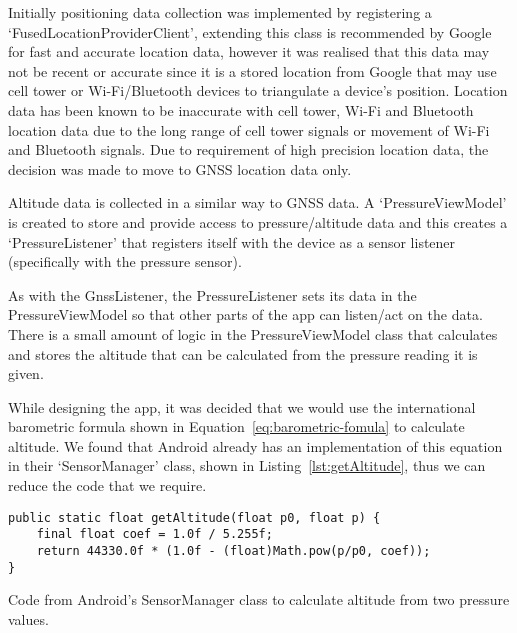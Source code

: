 Initially positioning data collection was implemented by registering a `FusedLocationProviderClient', extending this class is recommended by Google for fast and accurate location data, however it was realised that this data may not be recent or accurate since it is a stored location from Google that may use cell tower or Wi-Fi/Bluetooth devices to triangulate a device's position. Location data has been known to be inaccurate with cell tower, Wi-Fi and Bluetooth location data due to the long range of cell tower signals or movement of Wi-Fi and Bluetooth signals. Due to requirement of high precision location data, the decision was made to move to GNSS location data only.

Altitude data is collected in a similar way to GNSS data. A `PressureViewModel' is created to store and provide access to pressure/altitude data and this creates a `PressureListener' that registers itself with the device as a sensor listener (specifically with the pressure sensor).

As with the GnssListener, the PressureListener sets its data in the PressureViewModel so that other parts of the app can listen/act on the data. There is a small amount of logic in the PressureViewModel class that calculates and stores the altitude that can be calculated from the pressure reading it is given.

While designing the app, it was decided that we would use the international barometric formula shown in Equation~\vref{eq:barometric-fomula} to calculate altitude. We found that Android already has an implementation of this equation in their `SensorManager' class, shown in Listing~\vref{lst:getAltitude}, thus we can reduce the code that we require.

\begin{listing*}
  \centering
  \begin{verbatim}
public static float getAltitude(float p0, float p) {
    final float coef = 1.0f / 5.255f;
    return 44330.0f * (1.0f - (float)Math.pow(p/p0, coef));
}
  \end{verbatim}
  \caption{Code from Android's SensorManager class to calculate altitude from two pressure values.~\cite{_android_????-1}}\label{lst:getAltitude}
\end{listing*}

